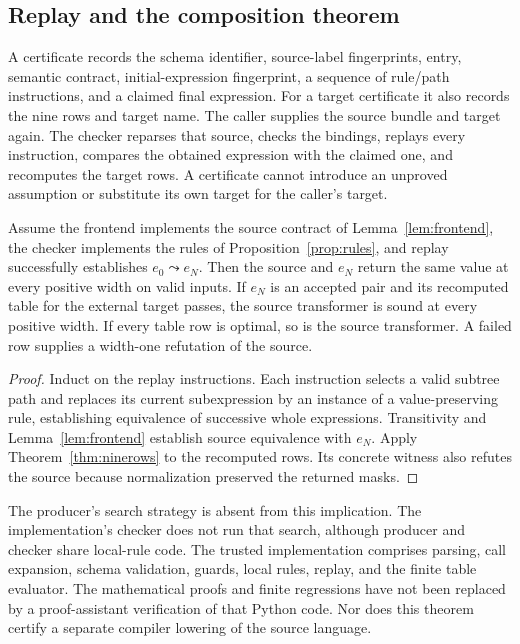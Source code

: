 \subsection{Replay and the composition theorem}
A certificate records the schema identifier, source-label fingerprints, entry, semantic contract, initial-expression fingerprint, a sequence of rule/path instructions, and a claimed final expression. For a target certificate it also records the nine rows and target name. The caller supplies the source bundle and target again. The checker reparses that source, checks the bindings, replays every instruction, compares the obtained expression with the claimed one, and recomputes the target rows. A certificate cannot introduce an unproved assumption or substitute its own target for the caller's target.

\begin{theorem}\label{thm:replay}
Assume the frontend implements the source contract of Lemma~\ref{lem:frontend}, the checker implements the rules of Proposition~\ref{prop:rules}, and replay successfully establishes $e_0\leadsto e_N$. Then the source and $e_N$ return the same value at every positive width on valid inputs. If $e_N$ is an accepted pair and its recomputed table for the external target passes, the source transformer is sound at every positive width. If every table row is optimal, so is the source transformer. A failed row supplies a width-one refutation of the source.
\end{theorem}
\begin{proof}
Induct on the replay instructions. Each instruction selects a valid subtree path and replaces its current subexpression by an instance of a value-preserving rule, establishing equivalence of successive whole expressions. Transitivity and Lemma~\ref{lem:frontend} establish source equivalence with $e_N$. Apply Theorem~\ref{thm:ninerows} to the recomputed rows. Its concrete witness also refutes the source because normalization preserved the returned masks.
\end{proof}

The producer's search strategy is absent from this implication. The implementation's checker does not run that search, although producer and checker share local-rule code. The trusted implementation comprises parsing, call expansion, schema validation, guards, local rules, replay, and the finite table evaluator. The mathematical proofs and finite regressions have not been replaced by a proof-assistant verification of that Python code. Nor does this theorem certify a separate compiler lowering of the source language.

